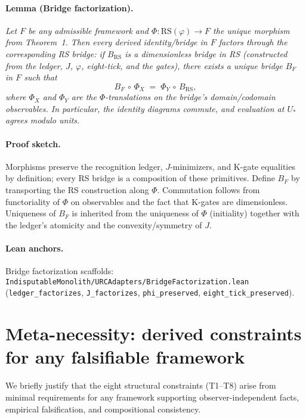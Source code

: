 \documentclass[11pt]{article}
\begin{document}
\paragraph{Lemma (Bridge factorization).} \emph{Let \(F\) be any admissible framework and \(\Phi\colon \mathrm{RS}(\varphi)\to F\) the unique morphism from Theorem~1. Then every derived identity/bridge in \(F\) factors through the corresponding RS bridge: if \(B_{\mathrm{RS}}\) is a dimensionless bridge in RS (constructed from the ledger, \(J\), \(\varphi\), eight\mbox{-}tick, and the gates), there exists a unique bridge \(B_F\) in \(F\) such that}
\[
  B_F\,\circ\, \Phi_X \;=\; \Phi_Y\,\circ\, B_{\mathrm{RS}},
\]
\emph{where \(\Phi_X\) and \(\Phi_Y\) are the \(\Phi\)\mbox{-}translations on the bridge's domain/codomain observables. In particular, the identity diagrams commute, and evaluation at \(U_*\) agrees modulo units.}

\paragraph{Proof sketch.} Morphisms preserve the recognition ledger, \(J\)\mbox{-}minimizers, and K\mbox{-}gate equalities by definition; every RS bridge is a composition of these primitives. Define \(B_F\) by transporting the RS construction along \(\Phi\). Commutation follows from functoriality of \(\Phi\) on observables and the fact that K\mbox{-}gates are dimensionless. Uniqueness of \(B_F\) is inherited from the uniqueness of \(\Phi\) (initiality) together with the ledger's atomicity and the convexity/symmetry of \(J\).

\paragraph{Lean anchors.} Bridge factorization scaffolds: \texttt{IndisputableMonolith/URCAdapters/BridgeFactorization.lean} (\texttt{ledger\_factorizes}, \texttt{J\_factorizes}, \texttt{phi\_preserved}, \texttt{eight\_tick\_preserved}).

\section{Meta-necessity: derived constraints for any falsifiable framework}\label{sec:meta-necessity}
We briefly justify that the eight structural constraints (T1--T8) arise from minimal requirements for any framework supporting observer-independent facts, empirical falsification, and compositional consistency.
\end{document}

